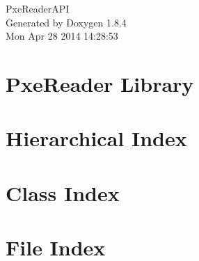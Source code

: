 \documentclass[twoside]{book}
\newcommand{\clearemptydoublepage}{%
  \newpage{\pagestyle{empty}\cleardoublepage}%
}
\begin{document}
\hypersetup{pageanchor=false}
\begin{titlepage}
\vspace*{7cm}
\begin{center}%
{\Large Pxe\-Reader\-A\-P\-I }\\
\vspace*{1cm}
{\large Generated by Doxygen 1.8.4}\\
\vspace*{0.5cm}
{\small Mon Apr 28 2014 14:28:53}\\
\end{center}
\end{titlepage}
\clearemptydoublepage
\tableofcontents
\clearemptydoublepage
{}
\hypersetup{pageanchor=true}

\chapter{Pxe\-Reader Library}
\label{index}\hypertarget{index}{}
\chapter{Hierarchical Index}

\chapter{Class Index}

\chapter{File Index}

\end{document}
